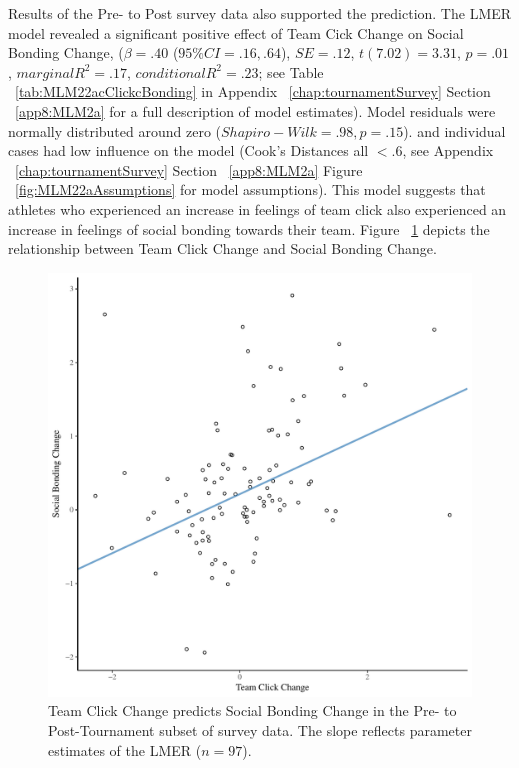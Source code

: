 \begin{CJK}{UTF8}{gbsn}
Results of the Pre- to Post survey data also supported the prediction.
The LMER model revealed a significant positive effect of Team Cick Change on Social Bonding Change, ($\beta = .40$ ($95\% CI =  .16, .64$), $SE = .12$, $t(7.02) = 3.31$, $p = .01$, $marginal R^2 = .17$, $conditional R^2 = .23$; see Table ~\ref{tab:MLM22acClickcBonding} in Appendix ~\ref{chap:tournamentSurvey} Section ~\ref{app8:MLM2a} for a full description of model estimates).  Model residuals were normally distributed around zero ($Shapiro-Wilk = .98, p = .15$). and individual cases had low influence on the model (Cook's Distances all $< .6$, see Appendix ~\ref{chap:tournamentSurvey} Section ~\ref{app8:MLM2a} Figure ~\ref{fig:MLM22aAssumptions} for model assumptions).  This model suggests that athletes who experienced an increase in feelings of team click also experienced an increase in feelings of social bonding towards their team.
Figure ~\ref{fig:clickBondDeltaModelSlope} depicts the relationship between Team Click Change and Social Bonding Change.

  \begin{figure}[htbp]
    \centering
  \includegraphics[scale=.5]{images/clickBondDeltaModelSlope.pdf}
    \caption{Team Click Change predicts Social Bonding Change in the Pre- to Post-Tournament subset of survey data. The slope reflects parameter estimates of the LMER ($n = 97$).}
    \label{fig:clickBondDeltaModelSlope}
  \end{figure}



\end{CJK}
